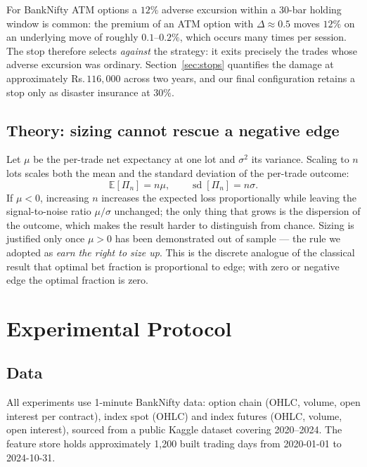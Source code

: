 \documentclass[11pt,a4paper]{article}
\newcommand{\rs}{Rs.\,}                 %
\begin{document}
For BankNifty ATM options a $12\%$ adverse excursion within a 30-bar holding window is
common: the premium of an ATM option with $\Delta \approx 0.5$ moves $12\%$ on an
underlying move of roughly $0.1$--$0.2\%$, which occurs many times per session. The stop
therefore selects \emph{against} the strategy: it exits precisely the trades whose
adverse excursion was ordinary. Section~\ref{sec:stops} quantifies the damage at
approximately \rs$116{,}000$ across two years, and our final configuration retains a
stop only as disaster insurance at $30\%$.

\subsection{Theory: sizing cannot rescue a negative edge}

Let $\mu$ be the per-trade net expectancy at one lot and $\sigma^2$ its variance. Scaling
to $n$ lots scales both the mean and the standard deviation of the per-trade outcome:
\begin{equation}
\mathbb{E}[\Pi_n] = n\mu, \qquad \operatorname{sd}[\Pi_n] = n\sigma .
\end{equation}
If $\mu < 0$, increasing $n$ increases the expected loss proportionally while leaving the
signal-to-noise ratio $\mu/\sigma$ unchanged; the only thing that grows is the dispersion
of the outcome, which makes the result harder to distinguish from chance. Sizing is
justified only once $\mu > 0$ has been demonstrated out of sample --- the rule we adopted
as \emph{earn the right to size up}. This is the discrete analogue of the classical
result that optimal bet fraction is proportional to edge; with zero or negative edge the
optimal fraction is zero.

\section{Experimental Protocol}\label{sec:protocol}

\subsection{Data}

All experiments use 1-minute BankNifty data: option chain (OHLC, volume, open interest
per contract), index spot (OHLC) and index futures (OHLC, volume, open interest), sourced
from a public Kaggle dataset covering 2020--2024. The feature store holds approximately
1{,}200 built trading days from 2020-01-01 to 2024-10-31.
\end{document}
